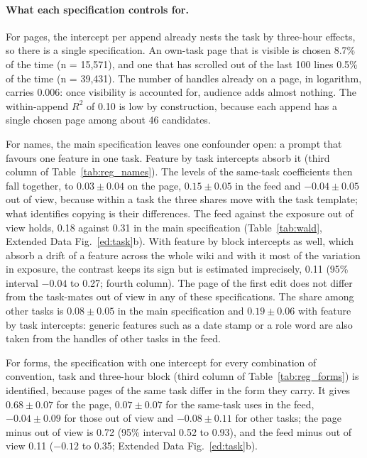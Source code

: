 \documentclass[10pt]{article}
\begin{document}
\paragraph{What each specification controls for.} For pages, the intercept per append already nests the task by three-hour effects, so there is a single specification. An own-task page that is visible is chosen 8.7\% of the time (n = 15,571), and one that has scrolled out of the last 100 lines 0.5\% of the time (n = 39,431). The number of handles already on a page, in logarithm, carries 0.006: once visibility is accounted for, audience adds almost nothing. The within-append $R^2$ of 0.10 is low by construction, because each append has a single chosen page among about 46 candidates.

For names, the main specification leaves one confounder open: a prompt that favours one feature in one task. Feature by task intercepts absorb it (third column of Table~\ref{tab:reg_names}). The levels of the same-task coefficients then fall together, to $0.03 \pm 0.04$ on the page, $0.15 \pm 0.05$ in the feed and $-0.04 \pm 0.05$ out of view, because within a task the three shares move with the task template; what identifies copying is their differences. The feed against the exposure out of view holds, 0.18 against 0.31 in the main specification (Table~\ref{tab:wald}, Extended Data Fig.~\ref{ed:task}b). With feature by block intercepts as well, which absorb a drift of a feature across the whole wiki and with it most of the variation in exposure, the contrast keeps its sign but is estimated imprecisely, 0.11 (95\% interval $-0.04$ to 0.27; fourth column). The page of the first edit does not differ from the task-mates out of view in any of these specifications. The share among other tasks is $0.08 \pm 0.05$ in the main specification and $0.19 \pm 0.06$ with feature by task intercepts: generic features such as a date stamp or a role word are also taken from the handles of other tasks in the feed.

For forms, the specification with one intercept for every combination of convention, task and three-hour block (third column of Table~\ref{tab:reg_forms}) is identified, because pages of the same task differ in the form they carry. It gives $0.68 \pm 0.07$ for the page, $0.07 \pm 0.07$ for the same-task uses in the feed, $-0.04 \pm 0.09$ for those out of view and $-0.08 \pm 0.11$ for other tasks; the page minus out of view is 0.72 (95\% interval 0.52 to 0.93), and the feed minus out of view 0.11 ($-0.12$ to 0.35; Extended Data Fig.~\ref{ed:task}b).
\end{document}
